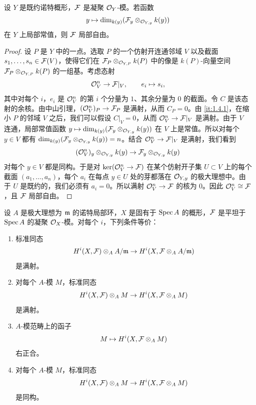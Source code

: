 \begin{lemma}\label{it:2.6.7}
设 $Y$ 是既约诺特概形，$\mathcal{F}$ 是凝聚 $\mathcal{O}_Y$-模。若函数
\[
y\mapsto\dim_{k(y)}(\mathcal{F}_y\otimes_{\mathcal{O}_{Y,y}}k(y))
\]
在 $Y$ 上局部常值，则 $\mathcal{F}$ 局部自由。
\end{lemma}

\begin{proof}
设 $P$ 是 $Y$ 中的一点。选取 $P$ 的一个仿射开连通邻域 $V$ 以及截面 $s_1,\dots,s_n\in\mathcal{F}(V)$，使得它们在 $\mathcal{F}_P\otimes_{\mathcal{O}_{Y,P}}k(P)$ 中的像是 $k(P)$-向量空间 $\mathcal{F}_P\otimes_{\mathcal{O}_{Y,P}}k(P)$ 的一组基。考虑态射
\[
\mathcal{O}_V^n\to\mathcal{F}|_V,\qquad e_i\mapsto s_i,
\]
其中对每个 $i$，$e_i$ 是 $\mathcal{O}_V^n$ 的第 $i$ 个分量为 $1$、其余分量为 $0$ 的截面。令 $C$ 是该态射的余核。由中山引理，$(\mathcal{O}_V^n)_P\to\mathcal{F}_P$ 是满射，从而 $C_P=0$。由 \ref{it:1.4.1}，在缩小 $P$ 的邻域 $V$ 之后，我们可以假设 $C|_V=0$，从而 $\mathcal{O}_V^n\to\mathcal{F}|_V$ 是满射。由于 $V$ 连通，局部常值函数 $y\mapsto\dim_{k(y)}(\mathcal{F}_y\otimes_{\mathcal{O}_{Y,y}}k(y))$ 在 $V$ 上是常值。所以对每个 $y\in V$ 都有 $\dim_{k(y)}(\mathcal{F}_y\otimes_{\mathcal{O}_{Y,y}}k(y))=n$。结合 $\mathcal{O}_V^n\to\mathcal{F}|_V$ 是满射，我们看到
\[
(\mathcal{O}_V^n)_y\otimes_{\mathcal{O}_{Y,y}}k(y)\to\mathcal{F}_y\otimes_{\mathcal{O}_{Y,y}}k(y)
\]
对每个 $y\in V$ 都是同构。于是对 $\ker(\mathcal{O}_V^n\to\mathcal{F})$ 在某个仿射开子集 $U\subset V$ 上的每个截面 $(a_1,\dots,a_n)$，每个 $a_i$ 在每点 $y\in U$ 处的芽都落在 $\mathcal{O}_{Y,y}$ 的极大理想中。由于 $U$ 是既约的，我们必须有 $a_i=0$。所以满射 $\mathcal{O}_V^n\to\mathcal{F}$ 的核为 $0$。因此 $\mathcal{O}_V^n\cong\mathcal{F}$，且 $\mathcal{F}$ 局部自由。
\end{proof}

\begin{proposition}\label{it:2.6.8}
设 $A$ 是极大理想为 $\mathfrak{m}$ 的诺特局部环，$X$ 是固有于 $\operatorname{Spec} A$ 的概形，$\mathcal{F}$ 是平坦于 $\operatorname{Spec} A$ 的凝聚 $\mathcal{O}_X$-模。对每个 $i$，下列条件等价：
\begin{enumerate}[label=(\roman*)]
\item 标准同态
\[
H^i(X,\mathcal{F})\otimes_A A/\mathfrak{m}\to H^i(X,\mathcal{F}\otimes_A A/\mathfrak{m})
\]
是满射。
\item 对每个 $A$-模 $M$，标准同态
\[
H^i(X,\mathcal{F})\otimes_A M\to H^i(X,\mathcal{F}\otimes_A M)
\]
是满射。
\item $A$-模范畴上的函子
\[
M\mapsto H^i(X,\mathcal{F}\otimes_A M)
\]
右正合。
\item 对每个 $A$-模 $M$，标准同态
\[
H^i(X,\mathcal{F})\otimes_A M\to H^i(X,\mathcal{F}\otimes_A M)
\]
是同构。
\end{enumerate}
\end{proposition}

